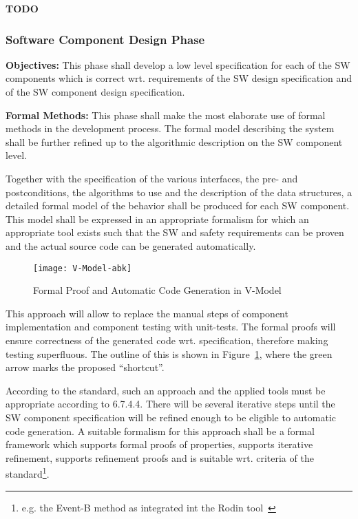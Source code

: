 {\Huge \bf TODO}

\subsubsection{Software Component Design Phase}
\label{sec:softw-comp-design}

{\bf Objectives:} This phase shall develop a low level specification for each of
the SW components which is correct wrt. requirements of the SW design
specification and of the SW component design specification.

{\bf Formal Methods:} This phase shall make the most elaborate use of formal
methods in the development process. The formal model describing the system shall
be further refined up to the algorithmic description on the SW component level.

Together with the specification of the various interfaces, the pre- and
postconditions, the algorithms to use and the description of the data
structures, a detailed formal model of the behavior shall be produced for each
SW component. This model shall be expressed in an appropriate formalism for
which an appropriate tool exists such that the SW and safety requirements can be
proven and the actual source code can be generated automatically.

\begin{figure}[ht]
  \centering
  \texttt{[image: V-Model-abk]}
  \caption{Formal Proof and Automatic Code Generation in V-Model}
  \label{fig:proof-code-generation}
\end{figure}

This approach will allow to replace the manual steps of component implementation
and component testing with unit-tests. The formal proofs will ensure correctness
of the generated code wrt. specification, therefore making testing
superfluous. The outline of this is shown in
Figure~\ref{fig:proof-code-generation}, where the green arrow marks the proposed
``shortcut''.

According to the standard, such an approach and the applied tools must be
appropriate according to 6.7.4.4. There will be several iterative steps until
the SW component specification will be refined enough to be eligible to
automatic code generation. A suitable formalism for this approach shall be a
formal framework which supports formal proofs of properties, supports iterative
refinement, supports refinement proofs and is suitable wrt. criteria of the
standard\footnote{e.g. the Event-B method as integrated int the Rodin
  tool~\cite{Abrial:Rodin}}.


